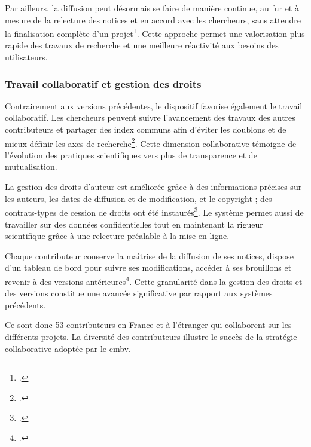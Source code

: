 Par ailleurs, la diffusion peut désormais se faire de manière continue, au fur et à mesure de la relecture des notices et en accord avec les chercheurs, sans attendre la finalisation complète d'un projet\footcite[Présentation de la base de données PHILIDOR en Octobre 2010]{michelbenoitDocumentationTechniqueBibliographique1997}. Cette approche permet une valorisation plus rapide des travaux de recherche et une meilleure réactivité aux besoins des utilisateurs.

\subsubsection{Travail collaboratif et gestion des droits}

Contrairement aux versions précédentes, le dispositif favorise également le travail collaboratif. Les chercheurs peuvent suivre l'avancement des travaux des autres contributeurs et partager des index communs afin d'éviter les doublons et de mieux définir les axes de recherche\footcite[Rapport sur le projet Philidor de Jérémie Crublet, juin 2006]{michelbenoitDocumentationTechniqueBibliographique1997}. Cette dimension collaborative témoigne de l'évolution des pratiques scientifiques vers plus de transparence et de mutualisation.

La gestion des droits d'auteur est améliorée grâce à des informations précises sur les auteurs, les dates de diffusion et de modification, et le copyright ; des contrats-types de cession de droits ont été instaurés\footcite[Présentation de la base de données PHILIDOR en Octobre 2010]{michelbenoitDocumentationTechniqueBibliographique1997}. Le système permet aussi de travailler sur des données confidentielles tout en maintenant la rigueur scientifique grâce à une relecture préalable à la mise en ligne. 

Chaque contributeur conserve la maîtrise de la diffusion de ses notices, dispose d'un tableau de bord pour suivre ses modifications, accéder à ses brouillons et revenir à des versions antérieures\footcite[Présentation de la base de données PHILIDOR en Octobre 2010]{michelbenoitDocumentationTechniqueBibliographique1997}. Cette granularité dans la gestion des droits et des versions constitue une avancée significative par rapport aux systèmes précédents.

Ce sont donc 53 contributeurs en France et à l'étranger qui collaborent sur les différents projets. La diversité des contributeurs illustre le succès de la stratégie collaborative adoptée par le \gls{cmbv}.


